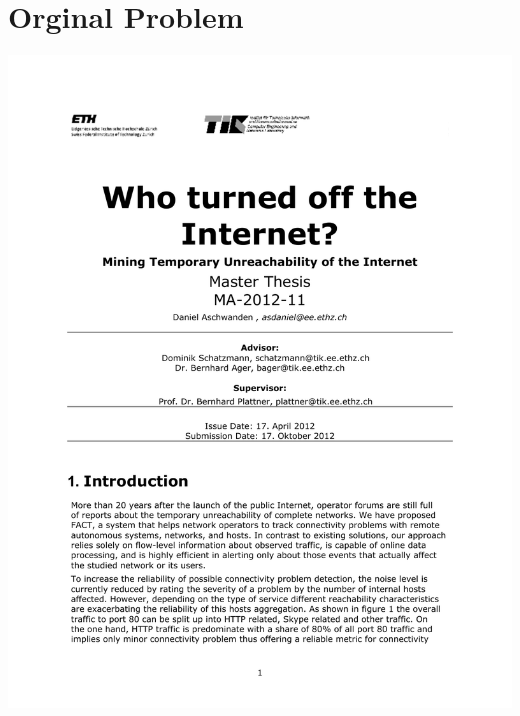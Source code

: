 
\section{Orginal Problem}

\includegraphics[width=\textwidth, page=1]{ThesisDescription.pdf}
\newpage
